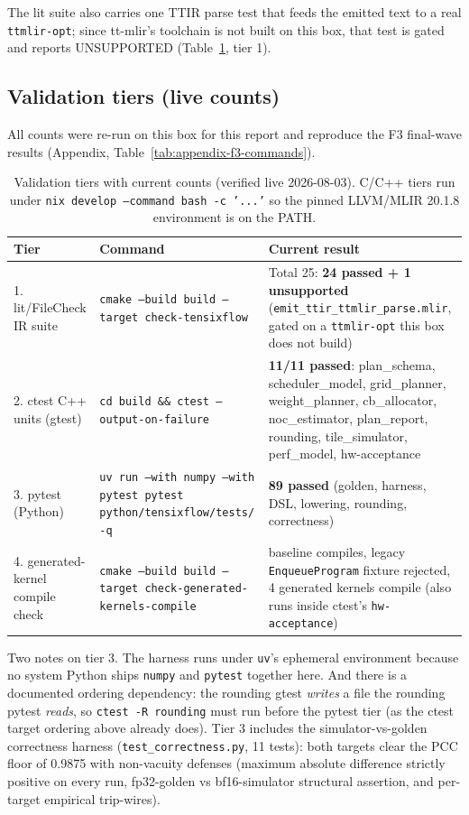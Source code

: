 The lit suite also carries one TTIR parse test that feeds the emitted text to
a real \texttt{ttmlir-opt}; since tt-mlir's toolchain is not built on this
box, that test is gated and reports UNSUPPORTED
(Table~\ref{tab:software-validation-tiers}, tier 1).

\subsection{Validation tiers (live counts)}\label{sec:software-validation}

All counts were re-run on this box for this report and reproduce the F3
final-wave results (Appendix, Table~\ref{tab:appendix-f3-commands}).

\begin{table}[htbp]
  \centering
  \caption{Validation tiers with current counts (verified live 2026-08-03).
  C/C++ tiers run under \texttt{nix develop --command bash -c '...'} so the
  pinned LLVM/MLIR 20.1.8 environment is on the PATH.}
  \label{tab:software-validation-tiers}
  \small
  \begin{tabular}{@{}p{2.6cm}p{7.4cm}p{5.1cm}@{}}
    \toprule
    \textbf{Tier} & \textbf{Command} & \textbf{Current result} \\
    \midrule
    1. lit/FileCheck IR suite & \texttt{cmake --build build --target check-tensixflow} & Total 25: \textbf{24 passed + 1 unsupported} (\texttt{emit\_ttir\_ttmlir\_parse.mlir}, gated on a \texttt{ttmlir-opt} this box does not build) \\
    2. ctest C++ units (gtest) & \texttt{cd build \&\& ctest --output-on-failure} & \textbf{11/11 passed}: plan\_schema, scheduler\_model, grid\_planner, weight\_planner, cb\_allocator, noc\_estimator, plan\_report, rounding, tile\_simulator, perf\_model, hw-acceptance \\
    3. pytest (Python) & \texttt{uv run --with numpy --with pytest pytest python/tensixflow/tests/ -q} & \textbf{89 passed} (golden, harness, DSL, lowering, rounding, correctness) \\
    4. generated-kernel compile check & \texttt{cmake --build build --target check-generated-kernels-compile} & baseline compiles, legacy \texttt{EnqueueProgram} fixture rejected, 4 generated kernels compile (also runs inside ctest's \texttt{hw-acceptance}) \\
    \bottomrule
  \end{tabular}
\end{table}

Two notes on tier 3. The harness runs under \texttt{uv}'s ephemeral
environment because no system Python ships \texttt{numpy} and \texttt{pytest}
together here. And there is a documented ordering dependency: the rounding
gtest \emph{writes} a file the rounding pytest \emph{reads}, so
\texttt{ctest -R rounding} must run before the pytest tier (as the ctest
target ordering above already does). Tier 3 includes the
simulator-vs-golden correctness harness (\texttt{test\_correctness.py}, 11
tests): both targets clear the PCC floor of 0.9875 with non-vacuity defenses
(maximum absolute difference strictly positive on every run, fp32-golden vs
bf16-simulator structural assertion, and per-target empirical trip-wires).

